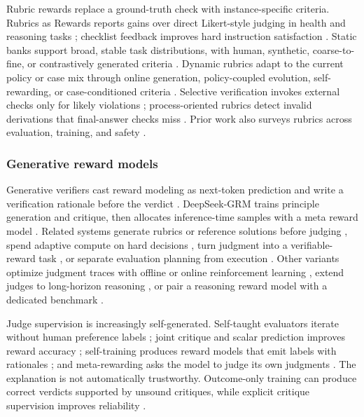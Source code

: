 Rubric rewards replace a ground-truth check with instance-specific criteria. Rubrics as Rewards reports gains over direct Likert-style judging in health and reasoning tasks \citep{gunjal2025rubrics}; checklist feedback improves hard instruction satisfaction \citep{viswanathan2025checklists}. Static banks support broad, stable task distributions, with human, synthetic, coarse-to-fine, or contrastively generated criteria \citep{huang2025reinforcement,li2026rubrichub,liu2025openrubrics}. Dynamic rubrics adapt to the current policy or case mix through online generation, policy-coupled evolution, self-rewarding, or case-conditioned criteria \citep{rezaei2025online,guan2026evorubric,ye2025selfrewarding,wang2025infimedorbit}. Selective verification invokes external checks only for likely violations \citep{wu2025rlac}; process-oriented rubrics detect invalid derivations that final-answer checks miss \citep{yuan2025curing}. Prior work also surveys rubrics across evaluation, training, and safety \citep{chen2026from}.

\subsubsection{Generative reward models}
\label{supp:subsec:reward-generative}

Generative verifiers cast reward modeling as next-token prediction and write a verification rationale before the verdict \citep{zhang2025genrm}. DeepSeek-GRM trains principle generation and critique, then allocates inference-time samples with a meta reward model \citep{liu2025inferencetime}. Related systems generate rubrics or reference solutions before judging \citep{chen2025rmr1}, spend adaptive compute on hard decisions \citep{guo2025reward}, turn judgment into a verifiable-reward task \citep{whitehouse2025j1}, or separate evaluation planning from execution \citep{saha2025learning}. Other variants optimize judgment traces with offline or online reinforcement learning \citep{huang2025thinkj}, extend judges to long-horizon reasoning \citep{hong2025thinkrm}, or pair a reasoning reward model with a dedicated benchmark \citep{zhou2025libra}.

Judge supervision is increasingly self-generated. Self-taught evaluators iterate without human preference labels \citep{wang2024selftaught}; joint critique and scalar prediction improves reward accuracy \citep{yu2024selfgenerated}; self-training produces reward models that emit labels with rationales \citep{wang2025gramr2}; and meta-rewarding asks the model to judge its own judgments \citep{wu2024metarewarding}. The explanation is not automatically trustworthy. Outcome-only training can produce correct verdicts supported by unsound critiques, while explicit critique supervision improves reliability \citep{wang2026reward}.

